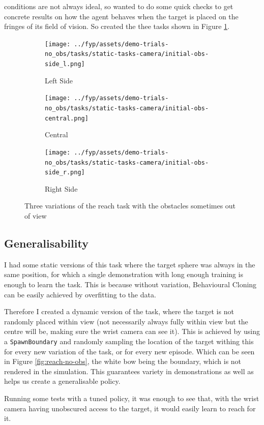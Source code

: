 conditions are not always ideal, so wanted to do some quick checks to get concrete results on how the agent behaves when the target is placed on the fringes of its field of vision. So created the thee tasks shown in Figure \ref{fig:no-obs-3-views}.

\begin{figure}[htbp]
  \begin{subfigure}{0.3\linewidth}
    \centering
    \texttt{[image: ../fyp/assets/demo-trials-no\_obs/tasks/static-tasks-camera/initial-obs-side\_l.png]}      
    \caption{Left Side}
  \end{subfigure}
  \hfill
  \begin{subfigure}{0.3\textwidth}
    \centering
    \texttt{[image: ../fyp/assets/demo-trials-no\_obs/tasks/static-tasks-camera/initial-obs-central.png]}
    \caption{Central}
  \end{subfigure}
  \hfill
  \begin{subfigure}{0.3\linewidth}
    \centering
    \texttt{[image: ../fyp/assets/demo-trials-no\_obs/tasks/static-tasks-camera/initial-obs-side\_r.png]}
    \caption{Right Side}
  \end{subfigure}%
  \caption{Three variations of the reach task with the obstacles sometimes out of view}\label{fig:no-obs-3-views}
\end{figure}


\subsection{Generalisability}
I had some static versions of this task where the target sphere was always in the same position, for which a single demonstration with long enough training is enough to learn the task. This is because without variation, Behavioural Cloning can be easily achieved by overfitting to the data. 

Therefore I created a dynamic version of the task, where the target is not randomly placed within view (not necessarily always fully within view but the centre will be, making sure the wrist camera can see it). This is achieved by using a \verb|SpawnBoundary| and randomly sampling the location of the target withing this for every new variation of the task, or for every new episode. Which can be seen in Figure \ref{fig:reach-no-obs}, the white bow being the boundary, which is not rendered in the simulation. This guarantees variety in demonstrations as well as helps us create a generalisable policy.

Running some tests with a tuned  policy, it was enough to see that, with the wrist camera having unobscured access to the target, it would easily learn to reach for it.


